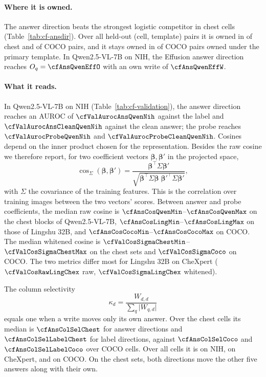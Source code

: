 \paragraph{Where it is owned.} The answer direction beats the strongest logistic competitor in \cfAnsChestBeats{} chest cells (Table~\ref{tab:cf-ansdir}). Over all held-out (cell, template) pairs it is owned in \cfAnsdirtChestOwnedPairs{} of \cfAnsdirtChestPairsAll{} chest and \cfAnsdirtCocoOwnedPairs{} of \cfAnsdirtCocoPairsAll{} COCO pairs, and it stays owned in \cfAnsdirtCocoKept{} of \cfAnsdirtCocoKeptN{} COCO pairs owned under the primary template. In Qwen2.5-VL-7B on NIH, the Effusion answer direction reaches $O_q=\cfAnsQwenEffO$ with an own write of $\cfAnsQwenEffW$.



\paragraph{What it reads.} In Qwen2.5-VL-7B on NIH (Table~\ref{tab:cf-validation}), the answer direction reaches an AUROC of $\cfValAurocAnsQwenNih$ against the label and $\cfValAurocAnsCleanQwenNih$ against the clean answer; the probe reaches $\cfValAurocProbeQwenNih$ and $\cfValAurocProbeCleanQwenNih$. Cosines depend on the inner product chosen for the representation\cite{park2024linear}. Besides the raw cosine we therefore report, for two coefficient vectors $\boldsymbol\beta,\boldsymbol\beta'$ in the projected space,
\begin{equation}
\cos_\Sigma(\boldsymbol\beta,\boldsymbol\beta')=\frac{\boldsymbol\beta^{\top}\Sigma\boldsymbol\beta'}{\sqrt{\boldsymbol\beta^{\top}\Sigma\boldsymbol\beta\;\boldsymbol\beta'^{\top}\Sigma\boldsymbol\beta'}},
\label{eq:whitened-cos}
\end{equation}
with $\Sigma$ the covariance of the training features. This is the correlation over training images between the two vectors' scores. Between answer and probe coefficients, the median raw cosine is $\cfAnsCosQwenMin$--$\cfAnsCosQwenMax$ on the chest blocks of Qwen2.5-VL-7B, $\cfAnsCosLingMin$--$\cfAnsCosLingMax$ on those of Lingshu 32B, and $\cfAnsCosCocoMin$--$\cfAnsCosCocoMax$ on COCO. The median whitened cosine is $\cfValCosSigmaChestMin$--$\cfValCosSigmaChestMax$ on the chest sets and $\cfValCosSigmaCoco$ on COCO. The two metrics differ most for Lingshu 32B on CheXpert ($\cfValCosRawLingChex$ raw, $\cfValCosSigmaLingChex$ whitened).

The column selectivity
\begin{equation}
\kappa_d=\frac{W_{d,d}}{\sum_q\lvert W_{q,d}\rvert}
\label{eq:column-selectivity}
\end{equation}
equals one when a write moves only its own answer. Over the \cfAnsColSelChestN{} chest cells its median is $\cfAnsColSelChest$ for answer directions and $\cfAnsColSelLabelChest$ for label directions, against $\cfAnsColSelCoco$ and $\cfAnsColSelLabelCoco$ over \cfAnsColSelCocoN{} COCO cells. Over all cells it is \cfValColSelNih{} on NIH, \cfValColSelChex{} on CheXpert, and \cfValColSelCoco{} on COCO. On the chest sets, both directions move the other five answers along with their own.

